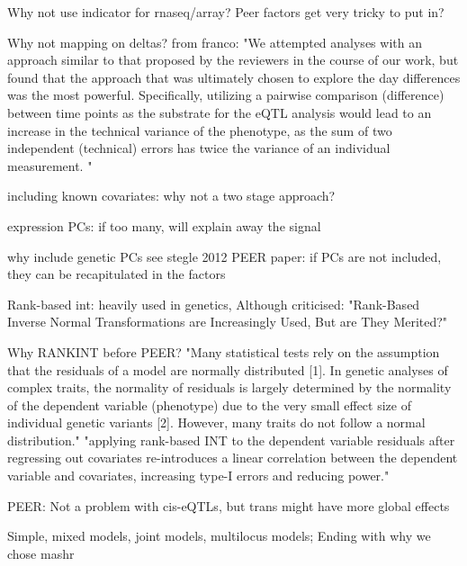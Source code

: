 Why not use indicator for rnaseq/array?
Peer factors get very tricky to put in?

Why not mapping on deltas?
from franco: "We attempted analyses with an approach similar to that proposed by the reviewers in the course of our work, but found that the approach that was ultimately chosen to explore the day differences was the most powerful. Specifically, utilizing a pairwise comparison (difference) between time points as the substrate for the eQTL analysis would lead to an increase in the technical variance of the phenotype, as the sum of two independent (technical) errors has twice the variance of an individual measurement. "

including known covariates: why not a two stage approach?

expression PCs: if too many, will explain away the signal

why include genetic PCs
see stegle 2012 PEER paper: if PCs are not included, they can be recapitulated in the factors

Rank-based int:
heavily used in genetics, 
    Although criticised: "Rank-Based Inverse Normal Transformations are Increasingly Used, But are They Merited?"

Why RANKINT before PEER?
"Many statistical tests rely on the assumption that the residuals of a model are normally distributed [1]. In genetic analyses of complex traits, the normality of residuals is largely determined by the normality of the dependent variable (phenotype) due to the very small effect size of individual genetic variants [2]. However, many traits do not follow a normal distribution."
"applying rank-based INT to the dependent variable residuals after regressing out covariates re-introduces a linear correlation between the dependent variable and covariates, increasing type-I errors and reducing power."

PEER:
Not a problem with cis-eQTLs, but trans might have more global effects

Simple, mixed models, joint models, multilocus models; Ending with why we chose mashr

